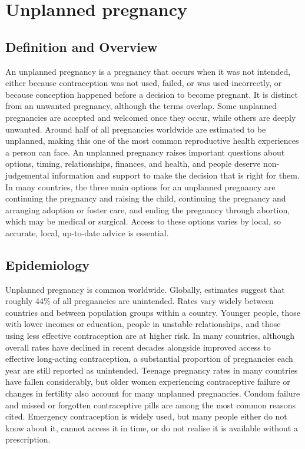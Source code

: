\chapter{Unplanned pregnancy}

\section*{Definition and Overview}
An unplanned pregnancy is a pregnancy that occurs when it was not intended, either because contraception was not used, failed, or was used incorrectly, or because conception happened before a decision to become pregnant. It is distinct from an unwanted pregnancy, although the terms overlap. Some unplanned pregnancies are accepted and welcomed once they occur, while others are deeply unwanted. Around half of all pregnancies worldwide are estimated to be unplanned, making this one of the most common reproductive health experiences a person can face. An unplanned pregnancy raises important questions about options, timing, relationships, finances, and health, and people deserve non-judgemental information and support to make the decision that is right for them. In many countries, the three main options for an unplanned pregnancy are continuing the pregnancy and raising the child, continuing the pregnancy and arranging adoption or foster care, and ending the pregnancy through abortion, which may be medical or surgical. Access to these options varies by local, so accurate, local, up-to-date advice is essential.

\section*{Epidemiology}
Unplanned pregnancy is common worldwide. Globally, estimates suggest that roughly 44\% of all pregnancies are unintended. Rates vary widely between countries and between population groups within a country. Younger people, those with lower incomes or education, people in unstable relationships, and those using less effective contraception are at higher risk. In many countries, although overall rates have declined in recent decades alongside improved access to effective long-acting contraception, a substantial proportion of pregnancies each year are still reported as unintended. Teenage pregnancy rates in many countries have fallen considerably, but older women experiencing contraceptive failure or changes in fertility also account for many unplanned pregnancies. Condom failure and missed or forgotten contraceptive pills are among the most common reasons cited. Emergency contraception is widely used, but many people either do not know about it, cannot access it in time, or do not realise it is available without a prescription.

